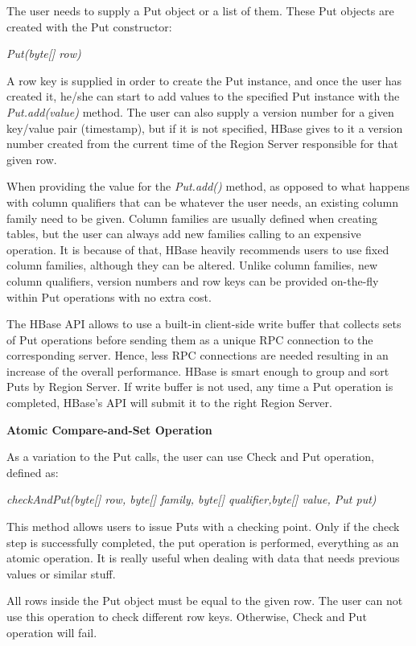 The user needs to supply a Put object or a list of them. These Put objects are created with the Put constructor:
\par
\bigskip
\centerline{\textit{Put(byte[] row)}}
\bigskip
A row key is supplied in order to create the Put instance, and once the user has created it, he/she can start to add values to the specified Put instance with the \textit{Put.add(value)} method. The user can also supply a version number for a given key/value pair (timestamp), but if it is not specified, HBase gives to it a version number created from the current time of the Region Server responsible for that given row.
\par
When providing the value for the \textit{Put.add()} method, as opposed to what happens with column qualifiers that can be whatever the user needs, an existing column family need to be given. Column families are usually defined when creating tables, but the user can always add new families calling to an expensive operation. It is because of that, HBase heavily recommends users to use fixed column families, although they can be altered.
Unlike column families, new column qualifiers, version numbers and row keys can be provided on-the-fly within Put operations with no extra cost.
\par
The HBase API allows to use a built-in client-side write buffer that collects sets of Put operations before sending them as a unique RPC connection to the corresponding server. Hence, less RPC connections are needed resulting in an increase of the overall performance. HBase is smart enough to group and sort Puts by Region Server. If write buffer is not used,  any time a Put operation is completed, HBase's API will submit it to the right Region Server.

\bigskip
\textbf{Atomic Compare-and-Set Operation}

As a variation to the Put calls, the user can use Check and Put operation, defined as:
\par
\bigskip
\centerline{\textit{checkAndPut(byte[] row, byte[] family, byte[] qualifier,byte[] value, Put put)}}
\bigskip
This method allows users to issue Puts with a checking point. Only if the check step is successfully completed, the put operation is performed, everything as an atomic operation. It is really useful when dealing with data that needs previous values or similar stuff.
\par
All rows inside the Put object must be equal to the given row. The user can not use this operation to check different row keys. Otherwise, Check and Put operation will fail.

